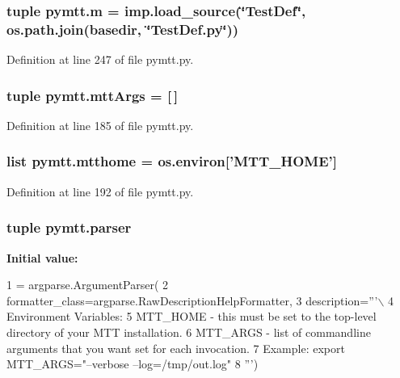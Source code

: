 \hypertarget{namespacepymtt_ab13a60c31fa69917ce06c1a2631aaf02}{
\subsubsection[{m}]{\setlength{\rightskip}{0pt plus 5cm}tuple pymtt.\-m = imp.\-load\-\_\-source(\char`\"{}Test\-Def\char`\"{}, os.\-path.\-join({\bf basedir}, \char`\"{}Test\-Def.\-py\char`\"{}))}}\label{namespacepymtt_ab13a60c31fa69917ce06c1a2631aaf02}


Definition at line 247 of file pymtt.\-py.

\hypertarget{namespacepymtt_a7dea31bd26744bab0b1c30dc11c718aa}{
\subsubsection[{mtt\-Args}]{\setlength{\rightskip}{0pt plus 5cm}tuple pymtt.\-mtt\-Args = \mbox{[}$\,$\mbox{]}}}\label{namespacepymtt_a7dea31bd26744bab0b1c30dc11c718aa}


Definition at line 185 of file pymtt.\-py.

\hypertarget{namespacepymtt_a109ef76f074b08666398bf6a38219cfc}{
\subsubsection[{mtthome}]{\setlength{\rightskip}{0pt plus 5cm}list pymtt.\-mtthome = os.\-environ\mbox{[}'M\-T\-T\-\_\-\-H\-O\-M\-E'\mbox{]}}}\label{namespacepymtt_a109ef76f074b08666398bf6a38219cfc}


Definition at line 192 of file pymtt.\-py.

\hypertarget{namespacepymtt_a95d54fdad48aac280be9d57cf81dee68}{
\subsubsection[{parser}]{\setlength{\rightskip}{0pt plus 5cm}tuple pymtt.\-parser}}\label{namespacepymtt_a95d54fdad48aac280be9d57cf81dee68}
{\bfseries Initial value\-:}
\begin{DoxyCode}
1 = argparse.ArgumentParser(
2     formatter\_class=argparse.RawDescriptionHelpFormatter,
3     description=\textcolor{stringliteral}{'''\(\backslash\)}
4 \textcolor{stringliteral}{Environment Variables:}
5 \textcolor{stringliteral}{  MTT\_HOME - this must be set to the top-level directory of your MTT installation.}
6 \textcolor{stringliteral}{  MTT\_ARGS - list of commandline arguments that you want set for each invocation.}
7 \textcolor{stringliteral}{    Example: export MTT\_ARGS="--verbose --log=/tmp/out.log"}
8 \textcolor{stringliteral}{'''})
\end{DoxyCode}


